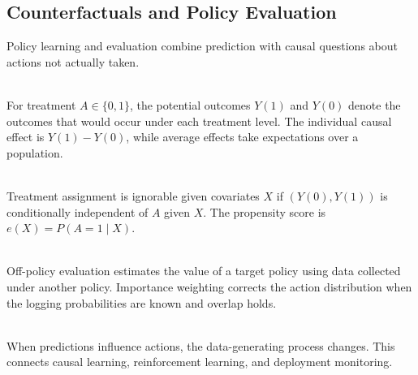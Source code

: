 \subsection{Counterfactuals and Policy Evaluation}

Policy learning and evaluation combine prediction with causal questions about actions not actually taken.

\begin{definition} \label{def:sl-potential-outcomes} \\
For treatment $A\in\{0,1\}$, the potential outcomes $Y(1)$ and $Y(0)$ denote the outcomes that would occur under each treatment level.  The individual causal effect is $Y(1)-Y(0)$, while average effects take expectations over a population.
\end{definition}

\begin{definition} \label{def:sl-ignorability-propensity} \\
Treatment assignment is ignorable given covariates $X$ if $(Y(0),Y(1))$ is conditionally independent of $A$ given $X$.  The propensity score is $e(X)=P(A=1\mid X)$.
\end{definition}

\begin{definition} \label{def:sl-off-policy-evaluation} \\
Off-policy evaluation estimates the value of a target policy using data collected under another policy.  Importance weighting corrects the action distribution when the logging probabilities are known and overlap holds.
\end{definition}

\begin{remark} \label{rem:sl-feedback-policy-learning} \\
When predictions influence actions, the data-generating process changes.  This connects causal learning, reinforcement learning, and deployment monitoring.
\end{remark}
